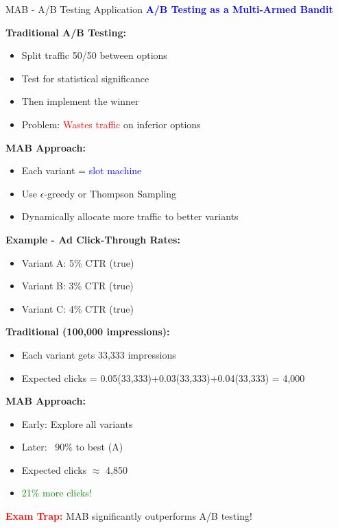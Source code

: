 \documentclass[8pt]{beamer}
\begin{document}
\begin{frame}{MAB - A/B Testing Application}
\fontsize{6.5}{7.5}\selectfont
\textcolor{blue}{\textbf{A/B Testing as a Multi-Armed Bandit}}

\textbf{Traditional A/B Testing:}
\begin{itemize}
\item Split traffic 50/50 between options
\item Test for statistical significance
\item Then implement the winner
\item Problem: \textcolor{red}{Wastes traffic} on inferior options
\end{itemize}

\textbf{MAB Approach:}
\begin{itemize}
\item Each variant = \textcolor{blue}{slot machine}
\item Use $\epsilon$-greedy or Thompson Sampling
\item Dynamically allocate more traffic to better variants
\end{itemize}

\textbf{Example - Ad Click-Through Rates:}
\begin{itemize}
\item Variant A: 5\% CTR (true)
\item Variant B: 3\% CTR (true)
\item Variant C: 4\% CTR (true)
\end{itemize}

\textbf{Traditional (100,000 impressions):}
\begin{itemize}
\item Each variant gets 33,333 impressions
\item Expected clicks = 0.05(33,333)+0.03(33,333)+0.04(33,333) = 4,000
\end{itemize}

\textbf{MAB Approach:}
\begin{itemize}
\item Early: Explore all variants
\item Later: ~90\% to best (A)
\item Expected clicks $\approx$ 4,850
\item \textcolor{green}{21\% more clicks!}
\end{itemize}

\textcolor{red}{\textbf{Exam Trap:}} MAB significantly outperforms A/B testing!
\end{frame}
\end{document}
